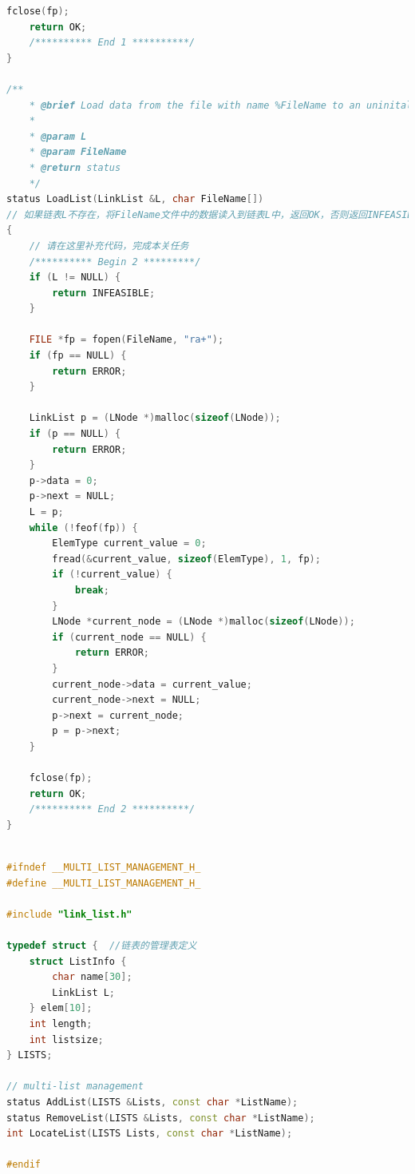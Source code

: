 \documentclass[supercite]{Experimental_Report}
\theoremstyle{definition}
\begin{document}
\begin{lstlisting}[caption={$link\_list.cpp$}, language=C++, frame=single]
	fclose(fp);
	return OK;
	/********** End 1 **********/
}

/**
	* @brief Load data from the file with name %FileName to an uninitalized list.
	*
	* @param L
	* @param FileName
	* @return status
	*/
status LoadList(LinkList &L, char FileName[])
// 如果链表L不存在，将FileName文件中的数据读入到链表L中，返回OK，否则返回INFEASIBLE。
{
	// 请在这里补充代码，完成本关任务
	/********** Begin 2 *********/
	if (L != NULL) {
		return INFEASIBLE;
	}

	FILE *fp = fopen(FileName, "ra+");
	if (fp == NULL) {
		return ERROR;
	}

	LinkList p = (LNode *)malloc(sizeof(LNode));
	if (p == NULL) {
		return ERROR;
	}
	p->data = 0;
	p->next = NULL;
	L = p;
	while (!feof(fp)) {
		ElemType current_value = 0;
		fread(&current_value, sizeof(ElemType), 1, fp);
		if (!current_value) {
			break;
		}
		LNode *current_node = (LNode *)malloc(sizeof(LNode));
		if (current_node == NULL) {
			return ERROR;
		}
		current_node->data = current_value;
		current_node->next = NULL;
		p->next = current_node;
		p = p->next;
	}

	fclose(fp);
	return OK;
	/********** End 2 **********/
}
	
\end{lstlisting}

\begin{lstlisting}[caption={$multi\_list\_management.h$}, language=C++, frame=single]
#ifndef __MULTI_LIST_MANAGEMENT_H_
#define __MULTI_LIST_MANAGEMENT_H_

#include "link_list.h"

typedef struct {  //链表的管理表定义
	struct ListInfo {
		char name[30];
		LinkList L;
	} elem[10];
	int length;
	int listsize;
} LISTS;

// multi-list management
status AddList(LISTS &Lists, const char *ListName);
status RemoveList(LISTS &Lists, const char *ListName);
int LocateList(LISTS Lists, const char *ListName);

#endif
\end{lstlisting}
\end{document}
